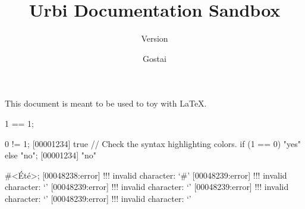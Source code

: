 \documentclass[openright,twoside,11pt]{book}
\title{Urbi Documentation Sandbox}
\subtitle{Version \VcsDescription}
\author{Gostai}
\begin{document}
This document is meant to be used to toy with \LaTeX.

\begin{urbiassert}
1 == 1;
\end{urbiassert}

\begin{urbiscript}
0 != 1;
[00001234] true
// Check the syntax highlighting colors.
if (1 == 0) "yes" else "no";
[00001234] "no"
\end{urbiscript}

\begin{urbiunchecked}[escapeinside=<>,firstnumber=last]
#<Été>;
[00048238:error] !!! invalid character: `#'
[00048239:error] !!! invalid character: `'
[00048239:error] !!! invalid character: `'
[00048239:error] !!! invalid character: `'
[00048239:error] !!! invalid character: `'
\end{urbiunchecked}
\end{document}
